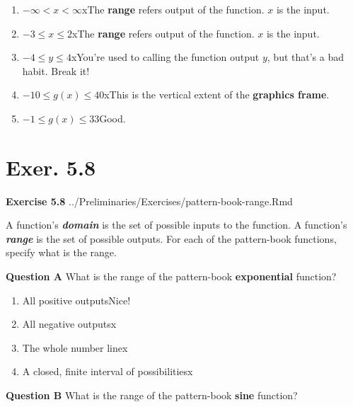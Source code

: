 \documentclass[
  letterpaper,
  DIV=11,
  numbers=noendperiod,
  oneside]{article}
\providecommand{\tightlist}{%
  \setlength{\itemsep}{0pt}\setlength{\parskip}{0pt}}\usepackage{longtable,booktabs,array}
\begin{document}
\begin{multicols}{2}
\begin{enumerate}
\def\labelenumi{\roman{enumi}.}
\tightlist
\item
  {\(-\infty < x < \infty\){xThe \textbf{range} refers output of the
  function. \(x\) is the input.}}\\
\item
  {\(-3 \leq x \leq 2\){xThe \textbf{range} refers output of the
  function. \(x\) is the input.}}\\
\item
  {\(-4 \leq y \leq 4\){xYou're used to calling the function output
  \(y\), but that's a bad habit. Break it!}}\\
\item
  {\(-10 \leq g(x) \leq 40\){xThis is the vertical extent of the
  \textbf{graphics frame}.}}\\
\item
  {\(-1 \leq g(x) \leq 33\){Good.~}}
\end{enumerate}

\hypertarget{exer.-5.8}{%
\section*{Exer. 5.8}\label{exer.-5.8}}

\textbf{Exercise 5.8} ../Preliminaries/Exercises/pattern-book-range.Rmd

A function's \textbf{\emph{domain}} is the set of possible inputs to the
function. A function's \textbf{\emph{range}} is the set of possible
outputs. For each of the pattern-book functions, specify what is the
range.

\textbf{Question A} What is the range of the pattern-book
\textbf{exponential} function?

\begin{enumerate}
\def\labelenumi{\roman{enumi}.}
\tightlist
\item
  {All positive outputs{Nice!~}}\\
\item
  {All negative outputs{x}}\\
\item
  {The whole number line{x}}\\
\item
  {A closed, finite interval of possibilities{x}}
\end{enumerate}

\textbf{Question B} What is the range of the pattern-book \textbf{sine}
function?


\end{multicols}
\end{document}
